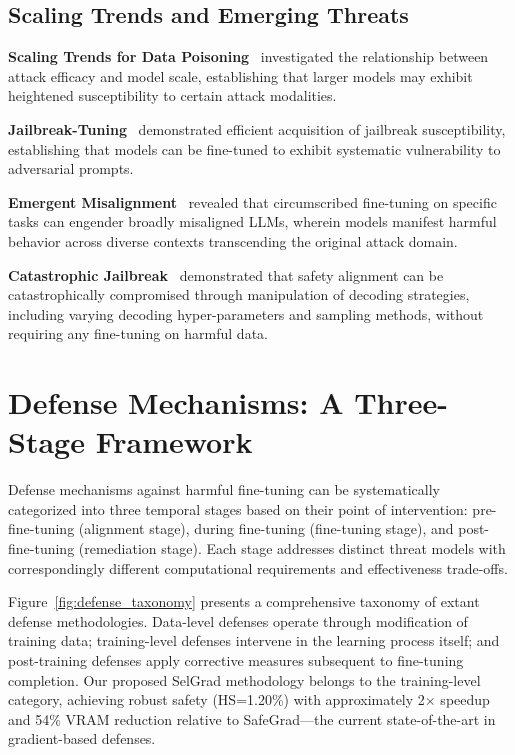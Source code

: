 \subsection*{Scaling Trends and Emerging Threats}
\textbf{Scaling Trends for Data Poisoning}~\cite{rando2024scaling} investigated the relationship between attack efficacy and model scale, establishing that larger models may exhibit heightened susceptibility to certain attack modalities.

\textbf{Jailbreak-Tuning}~\cite{li2025jailbreak} demonstrated efficient acquisition of jailbreak susceptibility, establishing that models can be fine-tuned to exhibit systematic vulnerability to adversarial prompts.

\textbf{Emergent Misalignment}~\cite{betley2025emergent} revealed that circumscribed fine-tuning on specific tasks can engender broadly misaligned LLMs, wherein models manifest harmful behavior across diverse contexts transcending the original attack domain.

\textbf{Catastrophic Jailbreak}~\cite{huang2024catastrophic} demonstrated that safety alignment can be catastrophically compromised through manipulation of decoding strategies, including varying decoding hyper-parameters and sampling methods, without requiring any fine-tuning on harmful data.

\section{Defense Mechanisms: A Three-Stage Framework}
\label{sec:defenses}

Defense mechanisms against harmful fine-tuning can be systematically categorized into three temporal stages based on their point of intervention: pre-fine-tuning (alignment stage), during fine-tuning (fine-tuning stage), and post-fine-tuning (remediation stage). Each stage addresses distinct threat models with correspondingly different computational requirements and effectiveness trade-offs.

Figure~\ref{fig:defense_taxonomy} presents a comprehensive taxonomy of extant defense methodologies. Data-level defenses operate through modification of training data; training-level defenses intervene in the learning process itself; and post-training defenses apply corrective measures subsequent to fine-tuning completion. Our proposed SelGrad methodology belongs to the training-level category, achieving robust safety (HS=1.20\%) with approximately 2$\times$ speedup and 54\% VRAM reduction relative to SafeGrad---the current state-of-the-art in gradient-based defenses.

